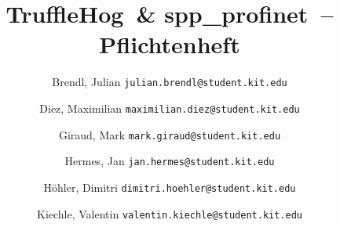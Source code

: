 \documentclass[a4paper]{scrreprt}
\newcommand{\sppname}{spp\_profinet}
\newcommand{\programname}{TruffleHog}
\begin{document}
\title{\programname \ \& \sppname \ -- Pflichtenheft}
\author{
    Brendl, Julian
    \texttt{julian.brendl@student.kit.edu}
    \and
    Diez, Maximilian
    \texttt{maximilian.diez@student.kit.edu}
    \and
    Giraud, Mark
    \texttt{mark.giraud@student.kit.edu}
    \and
    Hermes, Jan
    \texttt{jan.hermes@student.kit.edu}
    \and
    Höhler, Dimitri
    \texttt{dimitri.hoehler@student.kit.edu}
    \and
    Kiechle, Valentin
    \texttt{valentin.kiechle@student.kit.edu}
}
\maketitle



\newpage
\tableofcontents
\newpage
\listoffigures





















\appendix

\end{document}
